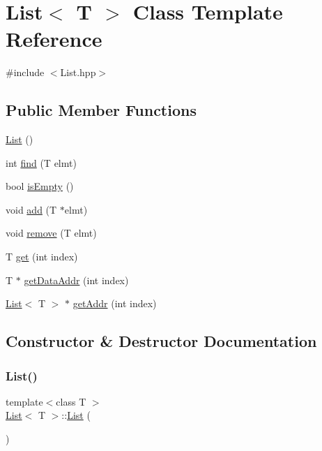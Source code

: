\hypertarget{class_list}{}\section{List$<$ T $>$ Class Template Reference}
\label{class_list}


{\ttfamily \#include $<$List.\+hpp$>$}

\subsection*{Public Member Functions}
\begin{DoxyCompactItemize}
\item 
\mbox{\hyperlink{class_list_a5c5e27671b21b3815d4e25b953c69454}{List}} ()
\item 
int \mbox{\hyperlink{class_list_afcc0ad2940d9efbd8b487bc40e3f0067}{find}} (T elmt)
\item 
bool \mbox{\hyperlink{class_list_a73f8b1d313382daffeeeed552f42da2f}{is\+Empty}} ()
\item 
void \mbox{\hyperlink{class_list_aea51297cc29bc89acf013d43636a6a19}{add}} (T $\ast$elmt)
\item 
void \mbox{\hyperlink{class_list_a7fac84accc112425caecf55c6b92911d}{remove}} (T elmt)
\item 
T \mbox{\hyperlink{class_list_a8674ced74b669f6c49292a4545c5b1e3}{get}} (int index)
\item 
T $\ast$ \mbox{\hyperlink{class_list_a09652510ae90b0f23ecfbc64fe81edc9}{get\+Data\+Addr}} (int index)
\item 
\mbox{\hyperlink{class_list}{List}}$<$ T $>$ $\ast$ \mbox{\hyperlink{class_list_ad34f9546e1bee20ecf23a985e34c3fb8}{get\+Addr}} (int index)
\end{DoxyCompactItemize}


\subsection{Constructor \& Destructor Documentation}
\mbox{\label{class_list_a5c5e27671b21b3815d4e25b953c69454}} 
\subsubsection{\texorpdfstring{List()}{List()}}
{\footnotesize\ttfamily template$<$class T $>$ \\
\mbox{\hyperlink{class_list}{List}}$<$ T $>$\+::\mbox{\hyperlink{class_list}{List}} (\begin{DoxyParamCaption}{ }\end{DoxyParamCaption})}




